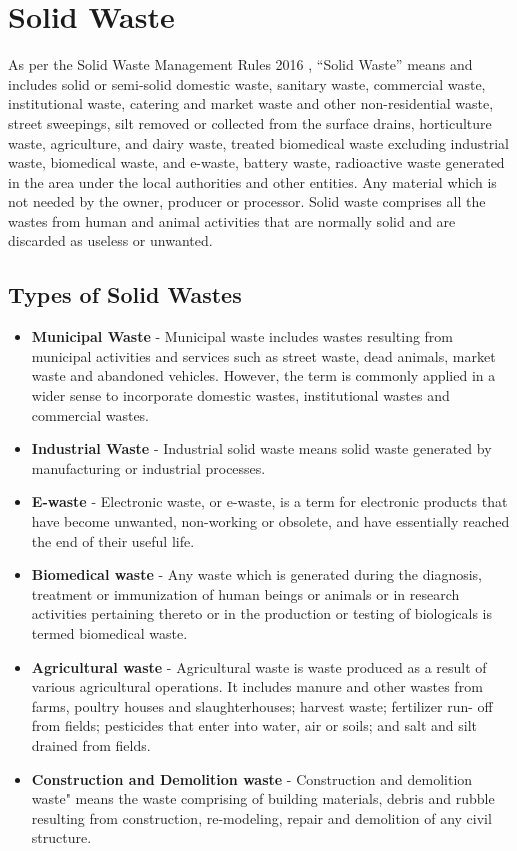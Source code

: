 \documentclass[12pt,a4paper]{report}
\begin{document}
\section{Solid Waste}
As per the Solid Waste Management Rules 2016 \cite{toolkit}, “Solid Waste” means and includes solid or semi-solid domestic waste, sanitary waste, commercial waste, institutional waste, catering and market waste and other non-residential waste, street sweepings, silt removed or collected from the surface drains, horticulture waste, agriculture, and dairy waste, treated biomedical waste excluding industrial waste, biomedical waste, and e-waste, battery waste, radioactive waste generated in the area under the local authorities and other entities. Any material which is not needed by the owner, producer or processor. Solid waste comprises all the wastes from human and animal activities that are normally solid and are discarded as useless or unwanted.

\subsection{Types of Solid Wastes}

\begin{itemize}
	\item \textbf{Municipal Waste} - Municipal waste includes wastes resulting from municipal activities and services such as street waste, dead animals, market waste and abandoned vehicles. However, the term is commonly applied in a wider sense to incorporate domestic wastes, institutional wastes and commercial wastes.
	
	\item \textbf{Industrial Waste} -  Industrial solid waste means solid waste generated by manufacturing or industrial processes.
	
	\item \textbf{E-waste} - Electronic waste, or e-waste, is a term for electronic products that have become unwanted, non-working or obsolete, and have essentially reached the end of their useful life.
	
	\item \textbf{Biomedical waste} - Any waste which is generated during the diagnosis, treatment or immunization of human beings or animals or in research activities pertaining thereto or in the production or testing of biologicals is termed biomedical waste.
	
	\item \textbf{Agricultural waste} - Agricultural waste is waste produced as a result of various agricultural operations. It includes manure and other wastes from farms, poultry houses and slaughterhouses; harvest waste; fertilizer run- off from fields; pesticides that enter into water, air or soils; and salt and silt drained from fields.
	
	\item \textbf{Construction and Demolition waste} - Construction and demolition waste" means the waste comprising of building materials, debris and rubble resulting from construction, re-modeling, repair and demolition of any civil structure.
	
\end{itemize}
\end{document}
